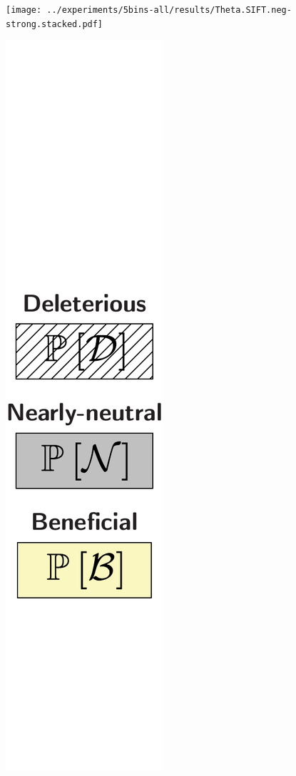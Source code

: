 \documentclass{article}
\begin{document}
\begin{center}
\begin{minipage}{0.09\linewidth}
        \end{minipage}
        \begin{minipage}{0.9\linewidth}
            \texttt{[image: ../experiments/5bins-all/results/Theta.SIFT.neg-strong.stacked.pdf]} \\
        \end{minipage}
        \begin{minipage}{0.09\linewidth}
            \includegraphics[width=\linewidth, page=1]{artworks/legend.polycat}

\end{minipage}
\end{center}
\end{document}
